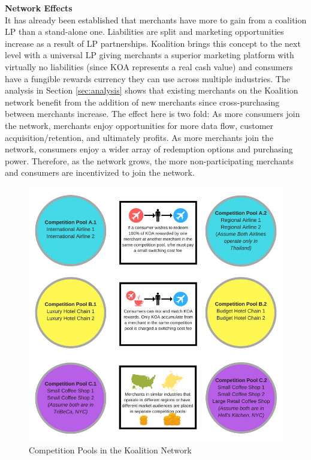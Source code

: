 \textbf{Network Effects} \\
It has already been established that merchants have more to gain from a coalition LP than a stand-alone one. Liabilities are split and marketing opportunities increase as a result of LP partnerships. Koalition brings this concept to the next level with a universal LP giving merchants a superior marketing platform with virtually no liabilities (since KOA represents a real cash value) and consumers have a fungible rewards currency they can use across multiple industries. The analysis in Section \ref{sec:analysis} shows that existing merchants on the Koalition network benefit from the addition of new merchants since cross-purchasing between merchants increase. The effect here is two fold: As more consumers join the network, merchants enjoy opportunities for more data flow, customer acquisition/retention, and ultimately profits. As more merchants join the network, consumers enjoy a wider array of redemption options and purchasing power. Therefore, as the network grows, the more non-participating merchants and consumers are incentivized to join the network. 
%
\begin{figure}[h]
	\centering
	\includegraphics[keepaspectratio,width=.8\textwidth]{images/CompetitionPools.png}
	\caption{Competition Pools in the Koalition Network} \label{fig:competitionpool}
\end{figure}

